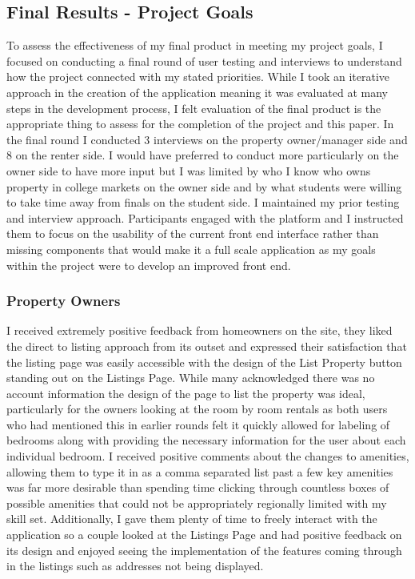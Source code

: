 \documentclass[10pt,twocolumn]{article}
\begin{document}
\subsection{Final Results - Project Goals}
To assess the effectiveness of my final product in meeting my project goals, I focused on conducting a final round of user testing and interviews to understand how the project connected with my stated priorities. While I took an iterative approach in the creation of the application meaning it was evaluated at many steps in the development process, I felt evaluation of the final product is the appropriate thing to assess for the completion of the project and this paper. In the final round I conducted 3 interviews on the property owner/manager side and 8 on the renter side. I would have preferred to conduct more particularly on the owner side to have more input but I was limited by who I know who owns property in college markets on the owner side and by what students were willing to take time away from finals on the student side. I maintained my prior testing and interview approach. Participants engaged with the platform and I instructed them to focus on the usability of the current front end interface rather than missing components that would make it a full scale application as my goals within the project were to develop an improved front end.


\subsubsection{Property Owners}
I received extremely positive feedback from homeowners on the site, they liked the direct to listing approach from its outset and expressed their satisfaction that the listing page was easily accessible with the design of the List Property button standing out on the Listings Page. While many acknowledged there was no account information the design of the page to list the property was ideal, particularly for the owners looking at the room by room rentals as both users who had mentioned this in earlier rounds felt it quickly allowed for labeling of bedrooms along with providing the necessary information for the user about each individual bedroom. I received positive comments about the changes to amenities, allowing them to type it in as a comma separated list past a few key amenities was far more desirable than spending time clicking through countless boxes of possible amenities that could not be appropriately regionally limited with my skill set. Additionally, I gave them plenty of time to freely interact with the application so a couple looked at the Listings Page and had positive feedback on its design and enjoyed seeing the implementation of the features coming through in the listings such as addresses not being displayed. 
\end{document}
